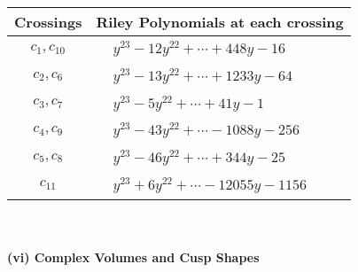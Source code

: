 \documentclass[1p]{elsarticle_modified}
\theoremstyle{definition}
\begin{document}
\begin{tabular}{m{50pt}|m{274pt}}
Crossings & \hspace{64pt}Riley Polynomials at each crossing \\
\hline $$\begin{aligned}c_{1},c_{10}\end{aligned}$$&$\begin{aligned}
&y^{23}-12 y^{22}+\cdots+448 y-16
\end{aligned}$\\
\hline $$\begin{aligned}c_{2},c_{6}\end{aligned}$$&$\begin{aligned}
&y^{23}-13 y^{22}+\cdots+1233 y-64
\end{aligned}$\\
\hline $$\begin{aligned}c_{3},c_{7}\end{aligned}$$&$\begin{aligned}
&y^{23}-5 y^{22}+\cdots+41 y-1
\end{aligned}$\\
\hline $$\begin{aligned}c_{4},c_{9}\end{aligned}$$&$\begin{aligned}
&y^{23}-43 y^{22}+\cdots-1088 y-256
\end{aligned}$\\
\hline $$\begin{aligned}c_{5},c_{8}\end{aligned}$$&$\begin{aligned}
&y^{23}-46 y^{22}+\cdots+344 y-25
\end{aligned}$\\
\hline $$\begin{aligned}c_{11}\end{aligned}$$&$\begin{aligned}
&y^{23}+6 y^{22}+\cdots-12055 y-1156
\end{aligned}$\\
\hline
\end{tabular}\\~\\
\newpage\flushleft \textbf{(vi) Complex Volumes and Cusp Shapes}
\end{document}
